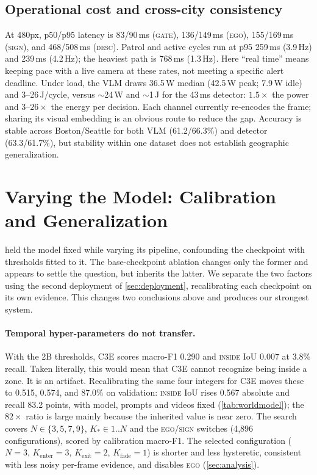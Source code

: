 \documentclass[10pt,twocolumn,letterpaper]{article}
\begin{document}
\subsection{Operational cost and cross-city consistency}
\label{sec:cost}

At 480px, p50/p95 latency is 83/90\,ms (\textsc{gate}), 136/149\,ms (\textsc{ego}), 155/169\,ms (\textsc{sign}), and 468/508\,ms (\textsc{desc}).  Patrol and active cycles run at p95 259\,ms (3.9\,Hz) and 239\,ms (4.2\,Hz); the heaviest path is 768\,ms (1.3\,Hz).  Here ``real time'' means keeping pace with a live camera at these rates, not meeting a specific alert deadline.  Under load, the VLM draws 36.5\,W median (42.5\,W peak; 7.9\,W idle) and 3--26\,J/cycle, versus $\sim$24\,W and $\sim$1\,J for the 43\,ms detector: $1.5\times$ the power and $3$--$26\times$ the energy per decision.  Each channel currently re-encodes the frame; sharing its visual embedding is an obvious route to reduce the gap.  Accuracy is stable across Boston/Seattle for both VLM (61.2/66.3\%) and detector (63.3/61.7\%), but stability within one dataset does not establish geographic generalization.

\section{Varying the Model: Calibration and Generalization}
\label{sec:worldmodel}

 held the model fixed while varying its pipeline, confounding the checkpoint with thresholds fitted to it.  The base-checkpoint ablation changes only the former and appears to settle the question, but inherits the latter.  We separate the two factors using the second deployment of \cref{sec:deployment}, recalibrating each checkpoint on its own evidence.  This changes two conclusions above and produces our strongest system.

\paragraph{Temporal hyper-parameters do not transfer.}  With the 2B thresholds, C3E scores macro-F1 0.290 and \textsc{inside} IoU 0.007 at 3.8\% recall.  Taken literally, this would mean that C3E cannot recognize being inside a zone.  It is an artifact.  Recalibrating the same four integers for C3E moves these to 0.515, 0.574, and 87.0\% on validation: \textsc{inside} IoU rises 0.567 absolute and recall 83.2 points, with model, prompts and videos fixed (\cref{tab:worldmodel}); the $82\times$ ratio is large mainly because the inherited value is near zero.  The search covers $N\in\{3,5,7,9\}$, $K_\ast\in 1..N$ and the \textsc{ego}/\textsc{sign} switches (4{,}896 configurations), scored by calibration macro-F1.  The selected configuration ($N{=}3$, $K_{\text{enter}}{=}3$, $K_{\text{exit}}{=}2$, $K_{\text{fade}}{=}1$) is shorter and less hysteretic, consistent with less noisy per-frame evidence, and disables \textsc{ego} (\cref{sec:analysis}).
\end{document}
